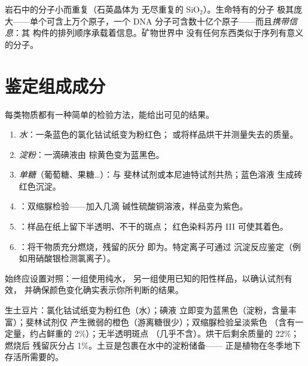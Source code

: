 \begin{remark}[大分子与生命的形态]\label{rem:g10:chemistry-of-life:macromolecules}
岩石中的分子小而重复（石英晶体为
无尽重复的 $\mathrm{SiO_2}$）。生命特有的分子
极其庞大——单个可含上万个原子，一个
DNA 分子可含数十亿个原子——而且\emph{携带信息}：其
构件的排列顺序承载着信息。矿物世界中
没有任何东西类似于序列有意义的分子。
\end{remark}

\section{鉴定组成成分}

\begin{method}[各类物质的标准检测方法]\label{met:g10:chemistry-of-life:tests}
每类物质都有一种简单的检验方法，能给出可见的结果。
\begin{enumerate}
  \item \emph{水}：一条蓝色的氯化钴试纸变为粉红色；
        或将样品烘干并测量失去的质量。
  \item \emph{淀粉}：一滴碘液由
        棕黄色变为蓝黑色。
  \item \emph{单糖}（葡萄糖、果糖\dots）：与
        斐林试剂或本尼迪特试剂共热；蓝色溶液
        生成砖红色沉淀。
  \item \emph{}：双缩脲检验——加入几滴
        碱性硫酸铜溶液，样品变为紫色。
  \item \emph{}：样品在纸上留下半透明、不干的斑点；
        红色染料苏丹 III 可使其着色。
  \item \emph{}：将干物质充分燃烧，残留的灰分
        即为。特定离子可通过
        沉淀反应鉴定（例如用硝酸银检测氯离子）。
\end{enumerate}
始终应设置对照：一组使用纯水，
另一组使用已知的阳性样品，以确认试剂有效，
并确保颜色变化确实表示你所判断的结果。
\end{method}

\begin{example}[分析土豆]\label{ex:g10:chemistry-of-life:potato}
生土豆片：氯化钴试纸变为粉红色（水）；碘液
立即变为蓝黑色（淀粉，含量丰富）；斐林试剂仅
产生微弱的橙色（游离糖很少）；双缩脲检验呈淡紫色
（含有一定量，约占鲜重的 2\%）；无半透明斑点
（几乎不含）。烘干后剩余质量的 22\%；燃烧后
残留灰分占 1\%。土豆是包裹在水中的淀粉储备——
正是植物在冬季地下存活所需要的。
\end{example}

